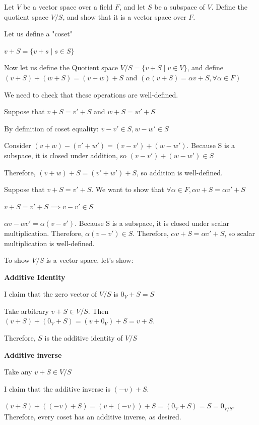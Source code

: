 \documentclass{article}
\begin{document}
\begin{problem}[30.26]
    Let $V$ be a vector space over a field $F$, and let $S$ be a subspace of $V$. Define the quotient space $V/S$, and show that it is a vector space over $F$.
\end{problem}
\bigskip
\begin{solution}
    Let us define a "coset"

    $v + S = \{v + s \mid s \in S\}$

    Now let us define the Quotient space $V/S = \{v + S \mid v \in V\}$, and define $(v+S) + (w+S) = (v+w) + S$ and $(\alpha (v+S) = \alpha v + S, \forall \alpha \in F)$

    We need to check that these operations are well-defined. 

    Suppose that $v+S = v' + S$ and  $w + S = w' + S$

    By definition of coset equality: 
    $v-v' \in S, w-w' \in S$

    Consider $(v+w) - (v' + w') = (v-v') + (w-w')$. Because S is a subspace, it is closed under addition, so $(v-v') + (w-w') \in S$
    

    Therefore, $(v+w) + S = (v' + w') + S$, so addition is well-defined. 

    Suppose that $v+S = v' + S$. We want to show that $\forall \alpha \in F, \alpha v + S = \alpha v' + S$

    $v + S = v' + S \implies v - v' \in S$

    $\alpha v - \alpha v' = \alpha (v - v')$. Because S is a subspace, it is closed under scalar multiplication. Therefore, $\alpha (v-v') \in S$. Therefore, $\alpha v + S = \alpha v' + S$, so scalar multiplication is well-defined. 

    To show $V/S$ is a vector space, let's show: 

    \textbf{Additive Identity}

    I claim that the zero vector of $V/S$ is $0_V + S = S$

    Take arbitrary $v+S \in V/S$. Then $(v+S) + (0_V + S) = (v+0_V) + S =v+S$. 

    Therefore, $S$ is the additive identity of $V/S$

    \textbf{Additive inverse} 

    Take any $v+S \in V/S$

    I claim that the additive inverse is $(-v) + S$. 

    $(v+S) + ((-v)+S) = (v + (-v)) + S = (0_V + S) = S = 0_{V/S}$. Therefore, every coset has an additive inverse, as desired. 


\end{solution}
\end{document}
